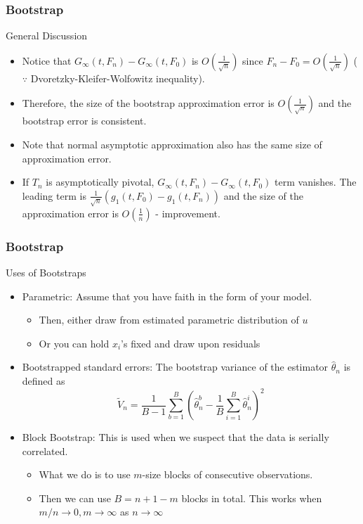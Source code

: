 \documentclass{beamer}
\begin{document}
\begin{frame}
\frametitle{Bootstrap}
General Discussion
\begin{itemize}
\item Notice that $G_\infty(t,F_n)-G_\infty(t,F_0)$ is $O\left( \frac{1}{\sqrt{n}}\right)$ since $F_n-F_0=O\left(\frac{1}{\sqrt{n}}\right)$ ($\because$ Dvoretzky-Kleifer-Wolfowitz inequality).\item Therefore, the size of the bootstrap approximation error is $O\left( \frac{1}{\sqrt{n}}\right)$ and the bootstrap error is consistent. \item Note that normal asymptotic approximation also has the same size of approximation error. 
\item If $T_n$ is asymptotically pivotal, $G_\infty(t,F_n)-G_\infty(t,F_0)$ term vanishes. The leading term is $\frac{1}{\sqrt{n}}(g_1(t,F_0)-g_1(t,F_n))$ and the size of the approximation error is $O\left( \frac{1}{n}\right)$ - improvement.
\end{itemize}
\end{frame}

\begin{frame}
\frametitle{Bootstrap}
Uses of Bootstraps
\begin{itemize}
\item Parametric: Assume that you have faith in the form of your model. 
\begin{itemize}
\item Then, either draw from estimated parametric distribution of $u$
\item Or you can hold $x_i$'s fixed and draw upon residuals
\end{itemize}
\item Bootstrapped standard errors: The bootstrap variance of the estimator $\hat{\theta}_n$ is defined as
\[
\tilde{V}_n = \frac{1}{B-1}\sum_{b=1}^B\left(\hat{\theta}_n^b-\frac{1}{B}\sum_{i=1}^B\hat{\theta}_n^i\right)^2
\]
\item Block Bootstrap: This is used when we suspect that the data is serially correlated. 
\begin{itemize} 
\item What we do is to use $m$-size blocks of consecutive observations. 
\item Then we can use $B=n+1-m$ blocks in total. This works when $m/n\to0, m\to\infty$ as $n\to\infty$
\end{itemize}
\end{itemize}
\end{frame}
\end{document}
